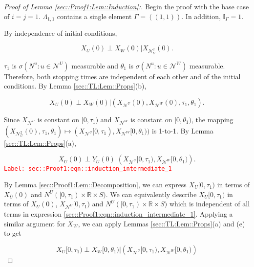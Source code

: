 \documentclass[12pt]{article}
\newcommand{\mb}{\mathbb}
\newcommand{\mc}{\mathcal}
\newcommand{\ov}{\overline}
\newcommand{\tr}{\textcolor{red}}
\newcommand{\labe}[1]{\tr{\texttt{Label: #1}}}
\newcommand{\vv}{u}								%
\renewcommand{\U}{U}							%
\newcommand{\UU}{W}								%
\renewcommand{\S}{S}							%
\newcommand{\X}{X}								%
\newcommand{\neigh}{\mc{N}}						%
\newcommand{\dneigh}{\mc{N}^2}					%
\newcommand{\vind}[1]{^{#1}}					%
\newcommand{\cind}[1]{_{#1}}					%
\newcommand{\cl}{\ov}							%
\newcommand{\tp}[1]{(#1)}						%
\newcommand{\tip}[1]{#1}						%
\newcommand{\poiss}{N}							%
\newcommand{\indx}[1]{_{#1}}					%
\newcommand{\dnvind}[1]{_{#1}}					%
\newcommand{\XX}{Y}								%
\newcommand{\rt}{\tau}							%
\newcommand{\rtt}{\theta}						%
\newcommand{\apath}{\Gamma}						%
\newcommand{\pathset}[2]{\Lambda_{#1,#2}}		%
\begin{document}
\begin{proof}[Proof of Lemma \ref{sec::Proof1:Lem::Induction}:]
Begin the proof with the base case of \(i=j =1\). \(\pathset{1}{1}\) contains a single element \(\apath\indx{} = ((1,1))\). In addition, \(\mb{I}_{\apath\indx{}} = 1\).

By independence of initial conditions,

\[\X\cind{\U}\tp{0}\perp \X\cind{\UU}\tp{0}|\X\cind{\dneigh\dnvind{\U}}\tp{0}.\]

\(\rt\indx{1}\) is \(\sigma\left(\poiss\vind{\vv}:\vv\in \neigh\vind{\U}\right)\) measurable and \(\rtt\indx{1}\) is \(\sigma\left(\poiss\vind{\vv}:\vv\in \neigh\vind{\UU}\right)\) measurable. Therefore, both stopping times are independent of each other and of the initial conditions. By Lemma \ref{sec::TL:Lem::Props}(b), 

\[\X\cind{\U}\tp{0}\perp \X\cind{\UU}\tp{0}|\left(\X\cind{\neigh\vind{\U}}\tp{0},\X\cind{\neigh\vind{\UU}}\tp{0},\rt\indx{1},\rtt\indx{1}\right).\]

Since \(\X\cind{\neigh\vind{\U}}\tip{}\) is constant on \([0,\rt\indx{1})\) and \(\X\cind{\neigh\vind{\UU}}\tip{}\) is constant on \([0,\rtt\indx{1})\), the mapping \((\X\cind{\dneigh\dnvind{\U}}\tp{0},\rt\indx{1},\rtt\indx{1}) \mapsto (\X\cind{\neigh\vind{\U}}\tip{[0,\rt\indx{1})},\X\cind{\neigh\vind{\UU}}\tip{[0,\rtt\indx{1})})\) is 1-to-1. By Lemma \ref{sec::TL:Lem::Props}(a),

\begin{equation}
\X\cind{\U}\tp{0}\perp \XX\cind{\U}\tp{0}|\left(\X\cind{\neigh\vind{\U}}\tip{[0,\rt\indx{1})},\X\cind{\neigh\vind{\UU}}\tip{[0,\rtt\indx{1})}\right).
\label{sec::Proof1:eqn::induction_intermediate_1}
\end{equation}
\labe{sec::Proof1:eqn::induction\_intermediate\_1}

By Lemma \ref{sec::Proof1:Lem::Decomposition}, we can express \(\X\cind{\U}\tip{[0,\rt\indx{1})}\) in terms of \(\X\cind{\cl{\U}}\tp{0}\) and \(\poiss\vind{\U}([0,\rt\indx{1})\times\mb{R}\times\S)\). We can equivalently describe \(\X\cind{\U}\tip{[0,\rt\indx{1})}\) in terms of \(\X\cind{\U}\tp{0}\), \(\X\cind{\neigh\vind{\U}}\tip{[0,\rt\indx{1})}\) and \(\poiss\vind{\U}([0,\rt\indx{1})\times \mb{R}\times \S)\) which is independent of all terms in expression \eqref{sec::Proof1:eqn::induction_intermediate_1}. Applying a similar argument for \(\X\cind{\UU}\tip{}\), we can apply Lemmas \ref{sec::TL:Lem::Props}(a) and (e) to get

\[\X\cind{\U}\tip{[0,\rt\indx{1})}\perp \X\cind{\UU}\tip{[0,\rtt\indx{1})}|\left(\X\cind{\neigh\vind{\U}}\tip{[0,\rt\indx{1})},\X\cind{\neigh\vind{\UU}}\tip{[0,\rtt\indx{1})}\right)\]


\end{proof}
\end{document}
